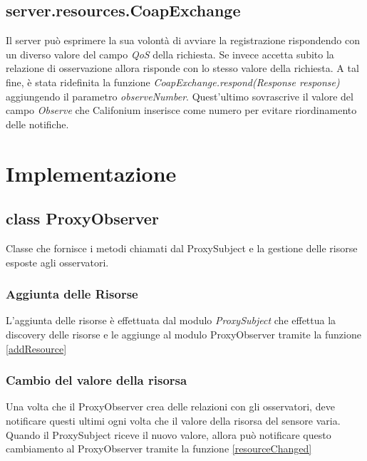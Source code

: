 			\subsection{server.resources.CoapExchange}
				Il server può esprimere la sua volontà di avviare la registrazione rispondendo con un diverso valore del campo \textit{QoS} della richiesta. Se invece accetta subito la relazione di osservazione allora risponde con lo stesso valore della richiesta. A tal fine, è stata ridefinita la funzione \textit{CoapExchange.respond(Response response)} aggiungendo il parametro \textit{observeNumber}. Quest'ultimo sovrascrive il valore del campo \textit{Observe} che Califonium inserisce come numero per evitare riordinamento delle notifiche.\newline
				

	\section{Implementazione}
		\subsection {class ProxyObserver}
			Classe che fornisce i metodi chiamati dal ProxySubject e la gestione delle risorse esposte agli osservatori.
			\subsubsection{Aggiunta delle Risorse}
				 L'aggiunta delle risorse è effettuata dal modulo \textit{ProxySubject} che effettua la discovery delle risorse e le aggiunge al modulo ProxyObserver tramite la funzione \ref{addResource}
				

			\subsubsection{Cambio del valore della risorsa}
				Una volta che il ProxyObserver crea delle relazioni con gli osservatori, deve notificare questi ultimi ogni volta che il valore della risorsa del sensore varia. Quando il ProxySubject riceve il nuovo valore, allora può notificare questo cambiamento al ProxyObserver tramite la funzione \ref{resourceChanged}
				

